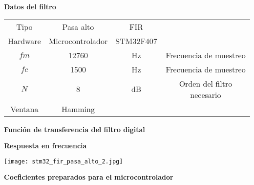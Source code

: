 \documentclass[informe.tex]{subfiles}
\begin{document}
\textbf{Datos del filtro}\newline	
								
	\begin{tabular}{ |c | c| c| c|}
		\hline
			 Tipo     & Pasa alto & FIR & \\	
 			 Hardware & Microcontrolador & STM32F407 & \\			 	
			$$ fm $$  & 12760  & Hz & Frecuencia de muestreo \\
			$$ fc $$  & 1500  & Hz & Frecuencia de muestreo \\
			$$ N $$   & 8  & dB & Orden del filtro necesario	\\		
			Ventana    & Hamming  & & 		\\	
		\hline
	\end{tabular}\newline\newline		
	
\textbf{Función de transferencia del filtro digital}\newline

	\begin{tiny}
		
	\end{tiny}\newline
	
\textbf{Respuesta en frecuencia}\newline
		
	\texttt{[image: stm32\_fir\_pasa\_alto\_2.jpg]}

\textbf{Coeficientes preparados para el microcontrolador}\newline

					

	
\end{document}
